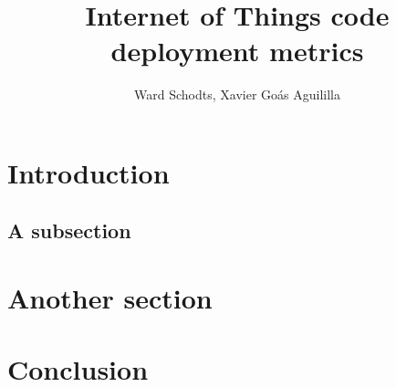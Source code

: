 \documentclass{article}
\title{Internet of Things code deployment metrics}
\author{Ward Schodts, Xavier Go\'as Aguililla}
\begin{document}
\maketitle

\begin{abstract}
  \lipsum[1]
\end{abstract}

\section{Introduction}

  \lipsum[2]

\subsection{A subsection}

  \lipsum[3]

\section{Another section}

  \lipsum[4]

\section{Conclusion}
 \lipsum[5]



\end{document}
